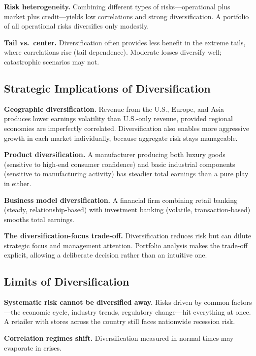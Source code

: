 \documentclass[11pt,openany]{book}
\begin{document}
\textbf{Risk heterogeneity.} Combining different types of risks---operational
plus market plus credit---yields low correlations and strong diversification.
A portfolio of all operational risks diversifies only modestly.

\textbf{Tail vs.\ center.} Diversification often provides less benefit in the
extreme tails, where correlations rise (tail dependence). Moderate losses
diversify well; catastrophic scenarios may not.

\subsection{Strategic Implications of Diversification}
\label{subsec:diversification-strategy}

\textbf{Geographic diversification.} Revenue from the U.S., Europe, and Asia
produces lower earnings volatility than U.S.-only revenue, provided regional
economies are imperfectly correlated. Diversification also enables more
aggressive growth in each market individually, because aggregate risk stays
manageable.

\textbf{Product diversification.} A manufacturer producing both luxury goods
(sensitive to high-end consumer confidence) and basic industrial components
(sensitive to manufacturing activity) has steadier total earnings than a pure
play in either.

\textbf{Business model diversification.} A financial firm combining retail
banking (steady, relationship-based) with investment banking (volatile,
transaction-based) smooths total earnings.

\textbf{The diversification-focus trade-off.} Diversification reduces risk but
can dilute strategic focus and management attention. Portfolio analysis makes
the trade-off explicit, allowing a deliberate decision rather than an
intuitive one.

\subsection{Limits of Diversification}
\label{subsec:diversification-limits}

\textbf{Systematic risk cannot be diversified away.} Risks driven by common
factors---the economic cycle, industry trends, regulatory change---hit
everything at once. A retailer with stores across the country still faces
nationwide recession risk.

\textbf{Correlation regimes shift.} Diversification measured in normal times
may evaporate in crises.
\end{document}
